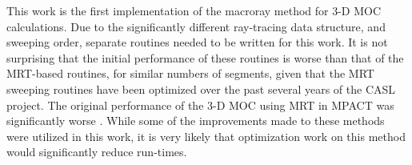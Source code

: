 {{    This work is the first implementation of the macroray method for 3-D \ac{MOC} calculations.
    Due to the significantly different ray-tracing data structure, and sweeping order, separate routines needed to be written for this work.
    It is not surprising that the initial performance of these routines is worse than that of the \ac{MRT}-based routines, for similar numbers of segments, given that the \ac{MRT} sweeping routines have been optimized over the past several years of the \ac{CASL} project.
    The original performance of the 3-D \ac{MOC} using \ac{MRT} in MPACT was significantly worse \cite{Kochunas2013}.
    While some of the improvements made to these methods were utilized in this work, it is very likely that optimization work on this method would significantly reduce run-times.
  }
  \printbibliography
}